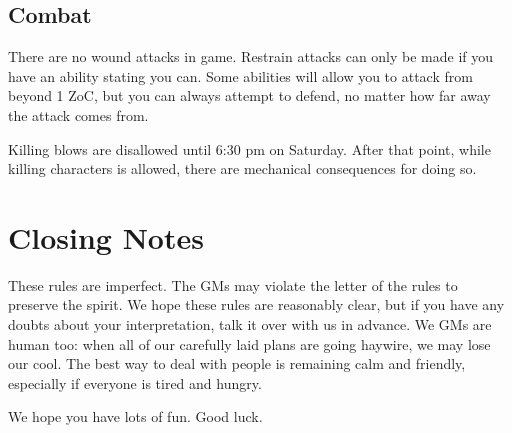 \documentclass[sheet]{GL2020}
\begin{document}
\subsection{Combat}
There are no wound attacks in game. Restrain attacks can only be made if you have an ability stating you can. Some abilities will allow you to attack from beyond 1 ZoC, but you can always attempt to defend, no matter how far away the attack comes from.

Killing blows are disallowed until 6:30 pm on Saturday. After that point, while killing characters is allowed, there are mechanical consequences for doing so.

\section{Closing Notes}

These rules are imperfect.  The GMs may violate the letter of the rules to preserve the spirit.  We hope these rules are reasonably clear, but if you have any doubts about your interpretation, talk it over with us in advance.  We GMs are human too: when all of our carefully laid plans are going haywire, we may lose our cool.  The best way to deal with people is remaining calm and friendly, especially if everyone is tired and hungry.

We hope you have lots of fun.  Good luck.
\end{document}
